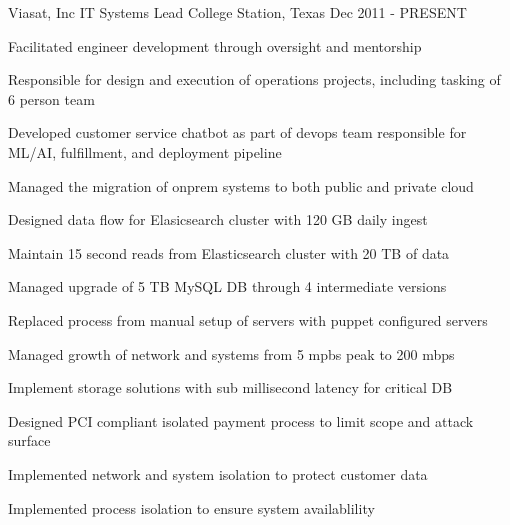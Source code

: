 

\begin{cventries}

  \cventry
    {Viasat, Inc} %
    {IT Systems Lead} %
    {College Station, Texas} %
    {Dec 2011 - PRESENT} %
    {
      \begin{cvitems} %
        \item {Facilitated engineer development through oversight and mentorship}
        \item {Responsible for design and execution of operations projects, including tasking of 6 person team}
        \item {Developed customer service chatbot as part of devops team responsible for ML/AI, fulfillment, and deployment pipeline}
        \item {Managed the migration of onprem systems to both public and private cloud}
        \item {Designed data flow for Elasicsearch cluster with 120 GB daily ingest}
        \item {Maintain 15 second reads from Elasticsearch cluster with 20 TB of data}
        \item {Managed upgrade of 5 TB MySQL DB through 4 intermediate versions}
        \item {Replaced process from manual setup of servers with puppet configured servers}
        \item {Managed growth of network and systems from 5 mpbs peak to 200 mbps}
        \item {Implement storage solutions with sub millisecond latency for critical DB}
        \item {Designed PCI compliant isolated payment process to limit scope and attack surface}
        \item {Implemented network and system isolation to protect customer data}
        \item {Implemented process isolation to ensure system availablility}
      \end{cvitems}
    }


\end{cventries}

